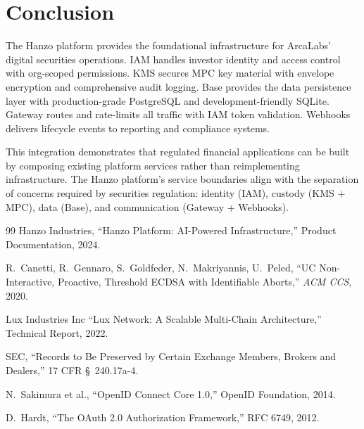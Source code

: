 \section{Conclusion}

\label{sec:conclusion}

The Hanzo platform provides the foundational infrastructure for
ArcaLabs' digital securities operations. IAM handles investor identity
and access control with org-scoped permissions. KMS secures MPC key
material with envelope encryption and comprehensive audit logging. Base
provides the data persistence layer with production-grade PostgreSQL and
development-friendly SQLite. Gateway routes and rate-limits all traffic
with IAM token validation. Webhooks delivers lifecycle events to
reporting and compliance systems.

This integration demonstrates that regulated financial applications can
be built by composing existing platform services rather than
reimplementing infrastructure. The Hanzo platform's service boundaries
align with the separation of concerns required by securities
regulation: identity (IAM), custody (KMS + MPC), data (Base), and
communication (Gateway + Webhooks).

\begin{thebibliography}{99}
Hanzo Industries, ``Hanzo Platform: AI-Powered Infrastructure,''
Product Documentation, 2024.

R.~Canetti, R.~Gennaro, S.~Goldfeder, N.~Makriyannis, U.~Peled,
``UC Non-Interactive, Proactive, Threshold ECDSA with Identifiable
Aborts,'' \textit{ACM CCS}, 2020.

Lux Industries Inc ``Lux Network: A Scalable Multi-Chain Architecture,''
Technical Report, 2022.

SEC, ``Records to Be Preserved by Certain Exchange Members, Brokers and
Dealers,'' 17 CFR \S~240.17a-4.

N.~Sakimura et al., ``OpenID Connect Core 1.0,'' OpenID Foundation,
2014.

D.~Hardt, ``The OAuth 2.0 Authorization Framework,'' RFC 6749, 2012.
\end{thebibliography}

